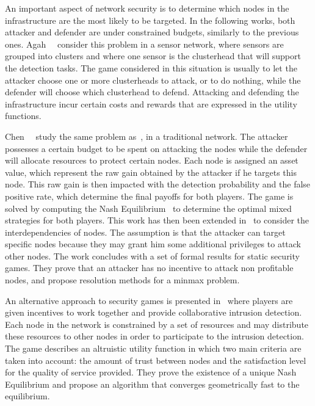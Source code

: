  An important aspect of network security is to determine which nodes in the infrastructure are the most likely to be targeted. 
 In the following works, both attacker and defender are under constrained budgets, similarly to the previous ones.
 Agah~\etal~\cite{agah2004} consider this problem in a sensor network, where sensors are grouped into clusters and where one sensor is the clusterhead that will support the detection tasks.
 The game considered in this situation is usually to let the attacker choose one or more clusterheads to attack, or to do nothing, while the defender will choose which clusterhead to defend.
 Attacking and defending the infrastructure incur certain costs and rewards that are expressed in the utility functions.
 
 Chen~\etal~\cite{Chen2009} study the same problem as~\cite{agah2004}, in a traditional network. The attacker possesses a certain budget to be spent on attacking the nodes while the defender will allocate resources to protect certain nodes.
 Each node is assigned an asset value, which represent the raw gain obtained by the attacker if he targets this node.
 This raw gain is then impacted with the detection probability and the false positive rate, which determine the final payoffs for both players.
 The game is solved by computing the Nash Equilibrium~\cite{nasheq} to determine the optimal mixed strategies for both players.
 This work has then been extended in~\cite{interdep-ismail2017} to consider the interdependencies of nodes.
 The assumption is that the attacker can target specific nodes because they may grant him some additional privileges to attack other nodes.
 The work concludes with a set of formal results for static security games.
 They prove that an attacker has no incentive to attack non profitable nodes, and propose resolution methods for a minmax problem.
 
 An alternative approach to security games is presented in~\cite{Zhu2009b} where players are given incentives to work together and provide  collaborative intrusion detection.
 Each node in the network is constrained by a set of resources and may distribute these resources to other nodes in order to participate to the intrusion detection.
 The game describes an altruistic utility function in which two main criteria are taken into account: the amount of trust between nodes and the satisfaction level for the quality of service provided.
 They prove the existence of a unique Nash Equilibrium and propose an algorithm that converges geometrically fast to the equilibrium.

